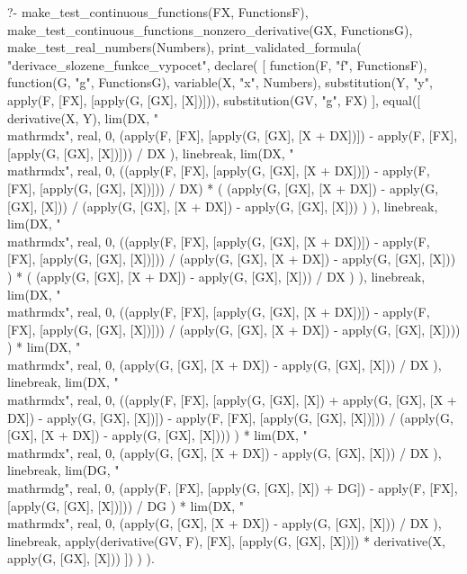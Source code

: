 \begin{prolog}
?-	make_test_continuous_functions(FX, FunctionsF),
	make_test_continuous_functions_nonzero_derivative(GX, FunctionsG),
	make_test_real_numbers(Numbers),
	print_validated_formula(
		"derivace_slozene_funkce_vypocet",
		declare(
			[
				function(F, "f", FunctionsF),
				function(G, "g", FunctionsG),
				variable(X, "x", Numbers),
				substitution(Y, "y", apply(F, [FX], [apply(G, [GX], [X])])),
				substitution(GV, "g", FX)   %
			],
			equal([
				derivative(X, Y),
				lim(DX, "\\mathrm{d}x", real, 0,
					(apply(F, [FX], [apply(G, [GX], [X + DX])]) - apply(F, [FX], [apply(G, [GX], [X])])) / DX
				),
				linebreak,
				lim(DX, "\\mathrm{d}x", real, 0, 
					((apply(F, [FX], [apply(G, [GX], [X + DX])]) - apply(F, [FX], [apply(G, [GX], [X])])) / DX) *
					(
						(apply(G, [GX], [X + DX]) - apply(G, [GX], [X])) / 
						(apply(G, [GX], [X + DX]) - apply(G, [GX], [X]))
					)
				),
				linebreak,
				lim(DX, "\\mathrm{d}x", real, 0, 
					((apply(F, [FX], [apply(G, [GX], [X + DX])]) - apply(F, [FX], [apply(G, [GX], [X])])) / (apply(G, [GX], [X + DX]) - apply(G, [GX], [X]))
				) *
					(
						(apply(G, [GX], [X + DX]) - apply(G, [GX], [X])) / 
						DX
					)
				),
				linebreak,
				lim(DX, "\\mathrm{d}x", real, 0, 
					((apply(F, [FX], [apply(G, [GX], [X + DX])]) - apply(F, [FX], [apply(G, [GX], [X])])) / (apply(G, [GX], [X + DX]) - apply(G, [GX], [X])))
				) *
				lim(DX, "\\mathrm{d}x", real, 0,
					(apply(G, [GX], [X + DX]) - apply(G, [GX], [X])) / 
					DX
				),
				linebreak,
				lim(DX, "\\mathrm{d}x", real, 0, 
					((apply(F, [FX], [apply(G, [GX], [X]) + apply(G, [GX], [X + DX]) - apply(G, [GX], [X])]) - apply(F, [FX], [apply(G, [GX], [X])])) / (apply(G, [GX], [X + DX]) - apply(G, [GX], [X])))
				) *
				lim(DX, "\\mathrm{d}x", real, 0,
					(apply(G, [GX], [X + DX]) - apply(G, [GX], [X])) / 
					DX
				),
				linebreak,
				lim(DG, "\\mathrm{d}g", real, 0, 
					(apply(F, [FX], [apply(G, [GX], [X]) + DG]) - apply(F, [FX], [apply(G, [GX], [X])])) / DG
				) *
				lim(DX, "\\mathrm{d}x", real, 0,
					(apply(G, [GX], [X + DX]) - apply(G, [GX], [X])) / 
					DX
				),
				linebreak,
				apply(derivative(GV, F), [FX], [apply(G, [GX], [X])]) * derivative(X, apply(G, [GX], [X]))
			])
		)
	).
\end{prolog}

